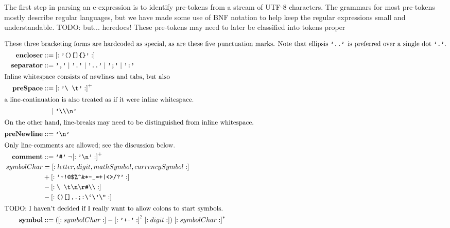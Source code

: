 \documentclass[11pt]{article} %
\begin{document}
The first step in parsing an e-expression is to identify pre-tokens from a stream of UTF-8 characters.
The grammars for most pre-tokens mostly describe regular languages, but we have made some use of BNF notation to help keep the regular expressions small and understandable.
TODO: but... heredocs!
These pre-tokens may need to later be classified into tokens proper

\newcommand{\gis}{\mathrel{::=}}
\newcommand{\gor}{\mathrel{\phantom{\gis}\mathllap{\mid}}}

\begin{align*}
\intertext{These three bracketing forms are hardcoded as special, as are these five punctuation marks.
  Note that ellipsis \literal{..} is preferred over a single dot \literal{.}.}
  \mathbf{encloser} &\gis \charclass{\literal{()[]\{\}}} \\
  \mathbf{separator} &\gis \literal{,} \mid \literal{.} \mid \literal{..} \mid \literal{;} \mid \literal{:} \\
\intertext{Inline whitespace consists of newlines and tabs, but also}
  \mathbf{preSpace} &\gis \charclass{\literal{\textbackslash{ }\textbackslash t}}^+ \\
\intertext{a line-continuation is also treated as if it were inline whitespace.}
                    &\gor \literal{\textbackslash\textbackslash\textbackslash n} \\
\intertext{On the other hand, line-breaks may need to be distinguished from inline whitespace.}
  \mathbf{preNewline} &\gis \literal{\textbackslash n} \\
\intertext{Only line-comments are allowed; see the discussion below.}
  \mathbf{comment} &\gis \literal{\#} \; \notcharclass{\literal{\textbackslash n}}^+ \\
  symbolChar &= \charclass{letter, digit, mathSymbol, currencySymbol} \\
             &+ \charclass{\literal{\textasciitilde!@\$\%\textasciicircum\&*-\textunderscore=+|<>/?}} \\
             &- \charclass{\texttt{\textbackslash{ }\textbackslash t\textbackslash n\textbackslash r\texttt\#\textbackslash\textbackslash}} \\
             &- \charclass{\texttt{()[]{},.;:\textbackslash`\textbackslash'\textbackslash"}} \\
\intertext{TODO: I haven't decided if I really want to allow colons to start symbols.}
  \mathbf{symbol} &\gis (\charclass{symbolChar} - \charclass{\literal{+-}}^? \; \charclass{digit}) \; \charclass{symbolChar}^* \\

\end{align*}
\end{document}
